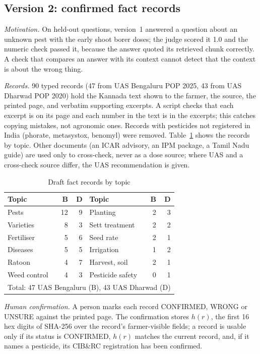 \documentclass[conference]{IEEEtran}
\begin{document}
\subsection{Version 2: confirmed fact records}
\textit{Motivation.} On held-out questions, version~1 answered a question about an unknown
pest with the early shoot borer doses; the judge scored it 1.0 and the numeric check passed
it, because the answer quoted its retrieved chunk correctly. A check that compares an answer
with its context cannot detect that the context is about the wrong thing.

\textit{Records.} 90 typed records (47 from UAS Bengaluru POP 2025, 43 from UAS Dharwad POP
2020) hold the Kannada text shown to the farmer, the source, the printed page, and verbatim
supporting excerpts. A script checks that each excerpt is on its page and each number in the
text is in the excerpts; this catches copying mistakes, not agronomic ones. Records with
pesticides not registered in India (phorate, metasystox, benomyl) were removed.
Table~\ref{tab:records} shows the records by topic. Other documents (an ICAR advisory, an
IPM package, a Tamil Nadu guide) are used only to cross-check, never as a dose source; where
UAS and a cross-check source differ, the UAS recommendation is given.

\begin{table}[t]
\centering
\caption{Draft fact records by topic}
\label{tab:records}
\footnotesize
\begin{tabular}{lrr|lrr}
\toprule
Topic & B & D & Topic & B & D\\
\midrule
Pests & 12 & 9 & Planting & 2 & 3\\
Varieties & 8 & 3 & Sett treatment & 2 & 2\\
Fertiliser & 5 & 6 & Seed rate & 2 & 1\\
Diseases & 5 & 5 & Irrigation & 1 & 2\\
Ratoon & 4 & 7 & Harvest, soil & 2 & 1\\
Weed control & 4 & 3 & Pesticide safety & 0 & 1\\
\midrule
\multicolumn{6}{l}{Total: 47 UAS Bengaluru (B), 43 UAS Dharwad (D)}\\
\bottomrule
\end{tabular}
\end{table}

\textit{Human confirmation.} A person marks each record CONFIRMED, WRONG or UNSURE against the
printed page. The confirmation stores $h(r)$, the first 16 hex digits of SHA-256 over the
record's farmer-visible fields; a record is usable only if its status is CONFIRMED, $h(r)$
matches the current record, and, if it names a pesticide, its CIB\&RC registration has been
confirmed.
\end{document}
